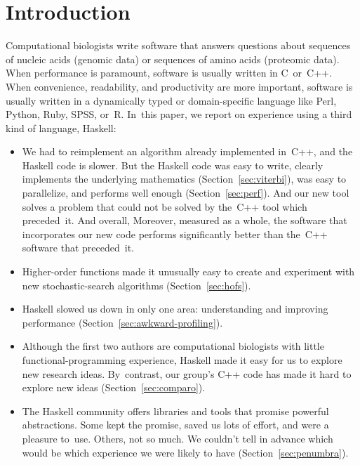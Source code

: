 \documentclass[preprint,nonatbib,blockstyle,times]{sigplanconf}
\newcommand\secref[1]{Section~\ref{sec:#1}}
\begin{document}
\endgroup

\section{Introduction}

Computational biologists write software that answers questions about 
sequences of nucleic acids (genomic data) or sequences of amino 
acids (proteomic data). 
When performance is paramount,
software is usually written in C~or~C++. 
When convenience, readability, and
productivity are more important,
software is usually written in a dynamically typed
or domain-specific language like
Perl, Python, Ruby, SPSS, or~R.
In~this paper, we report on experience using a third kind of language,
Haskell: 
\begin{itemize}
\item
We had to reimplement an
algorithm already implemented in~C++, 
and the Haskell code is slower.
But the Haskell code was easy to write,     %
clearly implements the underlying mathematics
 (\secref{viterbi}),
 was easy to parallelize,
and performs well enough
(\secref{perf}).
\ifpagetuning
  And our new tool solves a problem that could not be solved by
  the~C++ tool which preceded~it.
\else
  \ifpagetuning
  And overall,
  \else
  Moreover, measured as a whole, 
  \fi
  the software that incorporates our new
  code 
  performs significantly
  better than the~C++ software that preceded~it.
\fi
\item
Higher-order functions made it unusually easy to
create and experiment with new stochastic-search algorithms
(\secref{hofs}).
\item
Haskell slowed us down in only one area:  understanding and
improving
performance (\secref{awkward-profiling}).
\item
Although the first two authors are computational
biologists
with little functional-programming experience,
Haskell made it easy for us to explore new research ideas.
By~contrast,
our group's C++ code has 
made it hard to explore
new ideas
(\secref{comparo}).
\item
The Haskell community offers libraries and tools that
promise powerful abstractions.
Some kept the promise, saved us lots of effort, and were a pleasure
to~use.
Others, not so much.
We couldn't tell in advance which 
\ifpagetuning
would be which
\else
experience we were likely to have
\fi
 (\secref{penumbra}).
\end{itemize}
\end{document}
